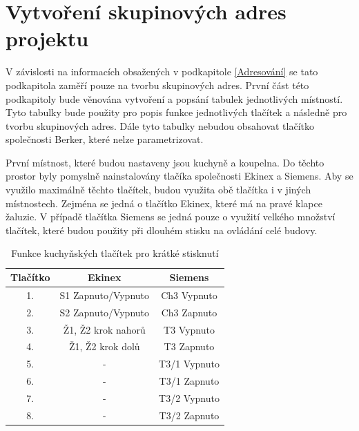 \section{Vytvoření skupinových adres projektu}
V závislosti na informacích obsažených v podkapitole \ref{Adresování} se tato podkapitola zaměří pouze na tvorbu skupinových adres. První část této podkapitoly bude věnována vytvoření a popsání tabulek jednotlivých místností. Tyto tabulky bude použity pro popis funkce jednotlivých tlačítek a následně pro tvorbu skupinových adres. Dále tyto tabulky nebudou obsahovat tlačítko společnosti Berker, které nelze parametrizovat.

První místnost, které budou nastaveny jsou kuchyně a koupelna. Do těchto prostor byly pomyslně nainstalovány tlačíka společnosti Ekinex a Siemens. Aby se využilo maximálně těchto tlačítek, budou využita obě tlačítka i v jiných místnostech. Zejména se jedná o tlačítko Ekinex, které má na pravé klapce žaluzie. V případě tlačítka Siemens se jedná pouze o využití velkého množství tlačítek, které budou použity při dlouhém stisku na ovládání celé budovy. 

\begin{table}[h]
 \caption[Funkce kuchyňských tlačítek pro krátké stisknutí]{Funkce kuchyňských tlačítek pro krátké stisknutí}
   \small
    \centering
	  \begin{tabular}{|c|c|c|}
	    \hline
	    Tlačítko & Ekinex & Siemens  \\
	    \hline\hline
	    1. & S1 Zapnuto/Vypnuto & Ch3 Vypnuto \\
	    \hline
        2. & S2 Zapnuto/Vypnuto & Ch3 Zapnuto \\
	    \hline
        3. & Ž1, Ž2 krok nahorů & T3 Vypnuto \\
	    \hline
        4. & Ž1, Ž2 krok dolů & T3 Zapnuto \\
	    \hline
        5. & - & T3/1 Vypnuto \\
	    \hline 
        6. & - & T3/1 Zapnuto \\
	    \hline 
	    7. & - & T3/2 Vypnuto \\
	    \hline
	    8. & - & T3/2 Zapnuto \\
	    \hline
	  \end{tabular}
\end{table}

